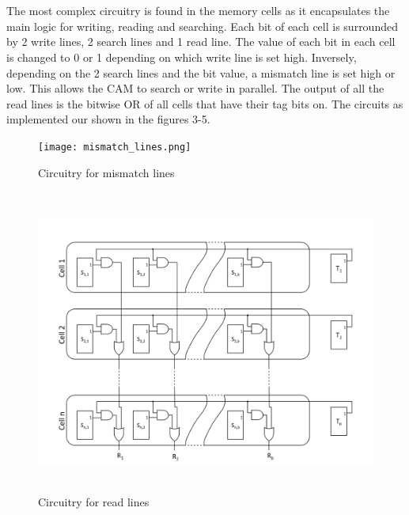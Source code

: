 \\\\
The most complex circuitry is found in the memory cells as it encapsulates the main logic for writing, reading and searching. 
Each bit of each cell is surrounded by 2 write lines, 2 search lines and 1 read line. 
The value of each bit in each cell is changed to 0 or 1 depending on which write line is set high. 
Inversely, depending on the 2 search lines and the bit value, a mismatch line is set high or low. 
This allows the CAM to search or write in parallel. 
The output of all the read lines is the bitwise OR of all cells that have their tag bits on. 
The circuits as implemented our shown in the figures 3-5. 
\br
\begin{figure}
    \texttt{[image: mismatch\_lines.png]}
    \caption[Short text]{Circuitry for mismatch lines}
    \includegraphics[height = 10cm, width=1\columnwidth, keepaspectratio]{read_lines.png}
    \caption[Short text]{Circuitry for read lines}
\end{figure}